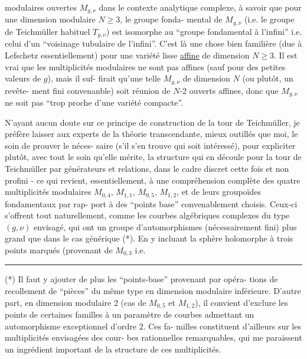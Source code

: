 
modulaires ouvertes $M_{g,\nu}$ dans le contexte analytique complexe,
à savoir que pour une dimension modulaire $N \geq 3$, le groupe fonda-%
mental de $M_{g,\nu}$ (i.e. le groupe de Teichmüller habituel $T_{g,\nu}$)
est isomorphe au ``groupe fondamental à l'infini'' i.e. celui d'un
``voisinage tubulaire de l'infini''. C'est là une chose bien familière
(due à Lefschetz essentiellement) pour une variété lisse \uline{affine} de
dimension $N \geq 3$. Il est vrai que les multiplicités modulaires ne
sont pas affines (sauf pour des petites valeurs de $g$), mais il suf-%
firait qu'une telle $M_{g,\nu}$ de dimension $N$ (ou plutôt, un revête-%
ment fini convenanble) soit réunion de $N$-2 ouverts affines, donc
que $M_{g,\nu}$ ne soit pas ``trop proche d'une variété compacte''.

N'ayant aucun doute sur ce principe de construction de la
tour de Teichmüller, je préfère laisser aux experts de la théorie
transcendante, mieux outillés que moi, le soin de prouver le néces-%
saire (s'il s'en trouve qui soit intéressé), pour expliciter plutôt,
avec tout le soin qu'elle mérite, la structure qui en découle pour
la tour de Teichmüller par générateurs et relations, dans le cadre
discret cette fois et non profini - ce qui revient, essentiellement,
à une compréhension complète des quatre multiplicités modulaires
$M_{0,4}$, $M_{1,1}$, $M_{0,5}$, $M_{1,2}$, et de leurs groupoïdes fondamentaux par rap-%
port à des ``points base'' convenablement choisis. Ceux-ci s'offrent
tout naturellement, comme les courbes algébriques complexes du type
$(g,\nu)$ envisagé, qui ont un groupe d'automorphismes (nécessairement
fini) plus grand que dans le cas générique (*). En y incluant la
sphère holomorphe à trois points marqués (provenant de $M_{0,3}$ i.e.

\rule{4cm}{0.4pt}

(*) Il faut y ajouter de plus les ``points-base'' provenant par opéra-%
tions de recollement de ``pièces'' du même type en dimension modulaire
inférieure. D'autre part, en dimension modulaire 2 (cas de $M_{0,5}$ et $M_{1,2}$),
il convient d'exclure les points de certaines familles à un paramètre
de courbes admettant un automorphisme exceptionnel d'ordre 2. Ces fa-%
milles constituent d'ailleurs sur les multiplicités envisagées des cour-%
bes rationnelles remarquables, qui me paraissent un ingrédient important
de la structure de ces multiplicités.

